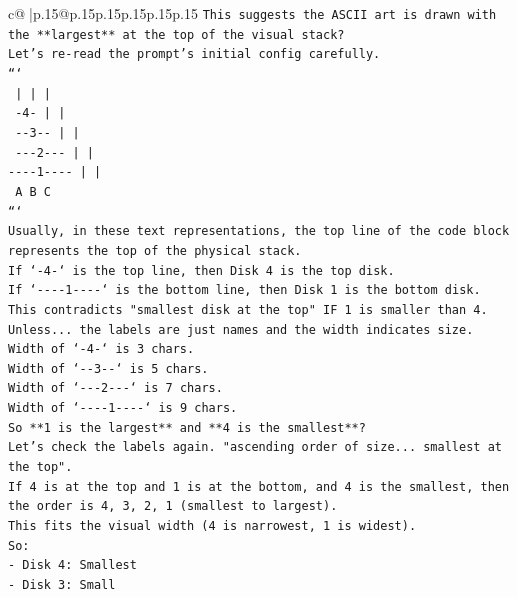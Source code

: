 \documentclass{article}
\begin{document}
{\begin{supertabular}{c@{$\;$}|p{.15\linewidth}@{}p{.15\linewidth}p{.15\linewidth}p{.15\linewidth}p{.15\linewidth}p{.15\linewidth}}
{{{\texttt{This suggests the ASCII art is drawn with the **largest** at the top of the visual stack?} \\
\texttt{Let's re{-}read the prompt's initial config carefully.} \\
\texttt{```} \\
\texttt{    |         |         |    } \\
\texttt{   {-}4{-}        |         |    } \\
\texttt{  {-}{-}3{-}{-}       |         |    } \\
\texttt{ {-}{-}{-}2{-}{-}{-}      |         |    } \\
\texttt{{-}{-}{-}{-}1{-}{-}{-}{-}     |         |    } \\
\texttt{    A         B         C    } \\
\texttt{```} \\
\texttt{Usually, in these text representations, the top line of the code block represents the top of the physical stack.} \\
\texttt{If `{-}4{-}` is the top line, then Disk 4 is the top disk.} \\
\texttt{If `{-}{-}{-}{-}1{-}{-}{-}{-}` is the bottom line, then Disk 1 is the bottom disk.} \\
\texttt{This contradicts "smallest disk at the top" IF 1 is smaller than 4.} \\
\texttt{Unless... the labels are just names and the width indicates size.} \\
\texttt{Width of `{-}4{-}` is 3 chars.} \\
\texttt{Width of `{-}{-}3{-}{-}` is 5 chars.} \\
\texttt{Width of `{-}{-}{-}2{-}{-}{-}` is 7 chars.} \\
\texttt{Width of `{-}{-}{-}{-}1{-}{-}{-}{-}` is 9 chars.} \\
\texttt{So **1 is the largest** and **4 is the smallest**?} \\
\texttt{Let's check the labels again. "ascending order of size... smallest at the top".} \\
\texttt{If 4 is at the top and 1 is at the bottom, and 4 is the smallest, then the order is 4, 3, 2, 1 (smallest to largest).} \\
\texttt{This fits the visual width (4 is narrowest, 1 is widest).} \\
\texttt{So:} \\
\texttt{{-} Disk 4: Smallest} \\
\texttt{{-} Disk 3: Small} \\
}}}
\end{supertabular}}
\end{document}
